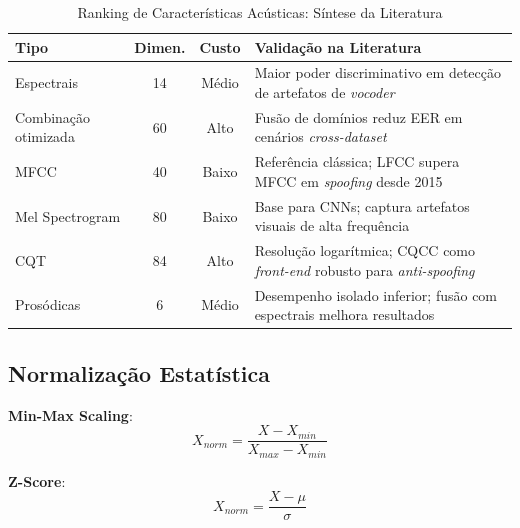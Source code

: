 \documentclass[12pt,a4paper]{article}
\begin{document}
\begin{table}[H]
\centering
\caption{Ranking de Caracter\'{i}sticas Ac\'{u}sticas: S\'{i}ntese da
Literatura}
\label{tab:ranking_features}
\small
\begin{tabular}{p{2.8cm}ccp{4.8cm}}
\toprule
\textbf{Tipo} & \textbf{Dimen.} & \textbf{Custo} &
\textbf{Valida\c{c}\~{a}o na Literatura} \\
\midrule
Espectrais
  & 14 & M\'{e}dio
  & Maior poder discriminativo em detec\c{c}\~{a}o de artefatos de
    \textit{vocoder}~\cite{bartusiak2022, todisco2016new} \\
\addlinespace
Combina\c{c}\~{a}o otimizada
  & 60 & Alto
  & Fus\~{a}o de dom\'{i}nios reduz EER em cen\'{a}rios
    \textit{cross-dataset}~\cite{wang2024asvspoof5} \\
\addlinespace
MFCC
  & 40 & Baixo
  & Refer\^{e}ncia cl\'{a}ssica; LFCC supera MFCC em \textit{spoofing}
    desde 2015~\cite{sahidullah2015comparison, todisco2019asvspoof} \\
\addlinespace
Mel Spectrogram
  & 80 & Baixo
  & Base para CNNs; captura artefatos visuais de alta
    frequ\^{e}ncia~\cite{jung2022aasist, tak2021rawnet2} \\
\addlinespace
CQT
  & 84 & Alto
  & Resolu\c{c}\~{a}o logar\'{i}tmica; CQCC como \textit{front-end}
    robusto para \textit{anti-spoofing}~\cite{todisco2016new} \\
\addlinespace
Pros\'{o}dicas
  & 6 & M\'{e}dio
  & Desempenho isolado inferior; fus\~{a}o com espectrais melhora
    resultados~\cite{yi2022add, muller2022warning} \\
\bottomrule
\end{tabular}
\end{table}

\subsection{Normaliza\c{c}\~{a}o Estat\'{i}stica}

\textbf{Min-Max Scaling}:
\begin{equation}
X_{norm} = \frac{X - X_{min}}{X_{max} - X_{min}}
\end{equation}

\textbf{Z-Score}:
\begin{equation}
X_{norm} = \frac{X - \mu}{\sigma}
\end{equation}

\end{document}
